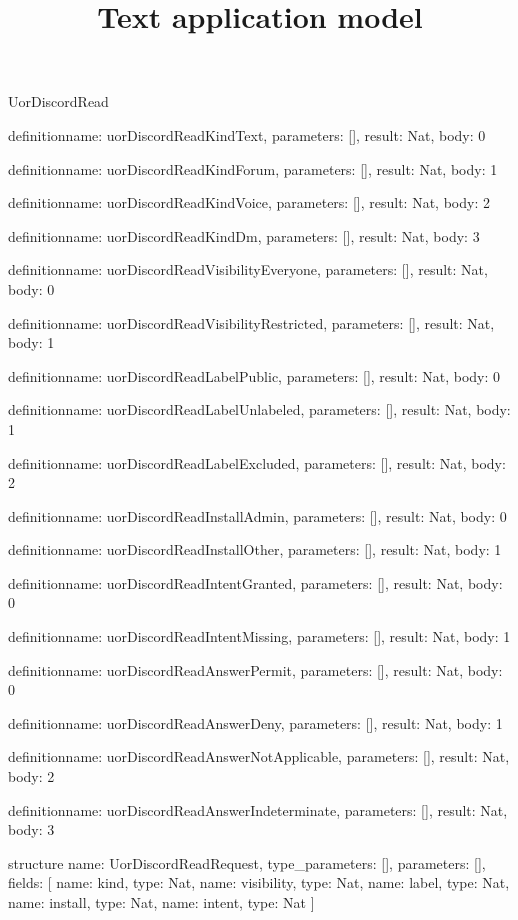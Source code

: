 \begin{lexlean}{UorDiscordRead}
\title{Text application model}
\begin{semanticmodule}
definition{name: uorDiscordReadKindText, parameters: [], result: Nat, body: 0}

definition{name: uorDiscordReadKindForum, parameters: [], result: Nat, body: 1}

definition{name: uorDiscordReadKindVoice, parameters: [], result: Nat, body: 2}

definition{name: uorDiscordReadKindDm, parameters: [], result: Nat, body: 3}

definition{name: uorDiscordReadVisibilityEveryone, parameters: [], result: Nat, body: 0}

definition{name: uorDiscordReadVisibilityRestricted, parameters: [], result: Nat, body: 1}

definition{name: uorDiscordReadLabelPublic, parameters: [], result: Nat, body: 0}

definition{name: uorDiscordReadLabelUnlabeled, parameters: [], result: Nat, body: 1}

definition{name: uorDiscordReadLabelExcluded, parameters: [], result: Nat, body: 2}

definition{name: uorDiscordReadInstallAdmin, parameters: [], result: Nat, body: 0}

definition{name: uorDiscordReadInstallOther, parameters: [], result: Nat, body: 1}

definition{name: uorDiscordReadIntentGranted, parameters: [], result: Nat, body: 0}

definition{name: uorDiscordReadIntentMissing, parameters: [], result: Nat, body: 1}

definition{name: uorDiscordReadAnswerPermit, parameters: [], result: Nat, body: 0}

definition{name: uorDiscordReadAnswerDeny, parameters: [], result: Nat, body: 1}

definition{name: uorDiscordReadAnswerNotApplicable, parameters: [], result: Nat, body: 2}

definition{name: uorDiscordReadAnswerIndeterminate, parameters: [], result: Nat, body: 3}

structure{
  name: UorDiscordReadRequest,
  type_parameters: [],
  parameters: [],
  fields: [
    {name: kind, type: Nat},
    {name: visibility, type: Nat},
    {name: label, type: Nat},
    {name: install, type: Nat},
    {name: intent, type: Nat}
  ]
}


\end{semanticmodule}
\end{lexlean}
